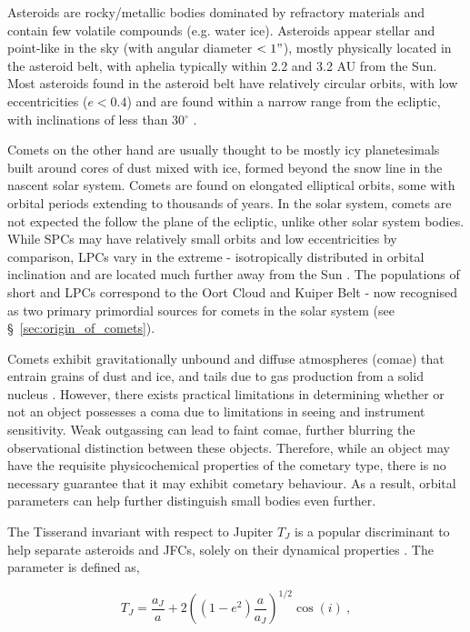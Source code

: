 Asteroids are rocky/metallic bodies dominated by refractory materials and contain few volatile compounds (e.g. water ice). Asteroids appear stellar and point-like in the sky (with angular diameter $< 1"$), mostly physically located in the asteroid belt, with aphelia typically within 2.2 and 3.2 AU from the Sun. Most asteroids found in the asteroid belt have relatively circular orbits, with low eccentricities ($e < 0.4$) and are found within a narrow range from the ecliptic, with inclinations of less than 30$^\circ$ \cite{2002AJ....123.2070T}. 

Comets on the other hand are usually thought to be mostly icy planetesimals built around cores of dust mixed with ice, formed beyond the snow line in the nascent solar system. Comets are found on elongated elliptical orbits, some with orbital periods extending to thousands of years. In the solar system, comets are not expected the follow the plane of the ecliptic, unlike other solar system bodies. While SPCs may have relatively small orbits and low eccentricities by comparison, LPCs vary in the extreme - isotropically distributed in orbital inclination and are located much further away from the Sun \cite{DEMEO2008436}. The populations of short and LPCs correspond to the Oort Cloud and Kuiper Belt -  now recognised as two primary primordial sources for comets in the solar system \cite{2017ApJ...845...27N} (see \S~\ref{sec:origin_of_comets}). 

Comets exhibit gravitationally unbound and diffuse atmospheres (comae) that entrain grains of dust and ice, and tails due to gas production from a solid nucleus \cite{1950ApJ...111..375W}. However, there exists practical limitations in determining whether or not an object possesses a coma due to limitations in seeing and instrument sensitivity. Weak outgassing can lead to faint comae, further blurring the observational distinction between these objects. Therefore, while an object may have the requisite physicochemical properties of the cometary type, there is no necessary guarantee that it may exhibit cometary behaviour. As a result, orbital parameters can help further distinguish small bodies even further.

The Tisserand invariant with respect to Jupiter $T_J$ is a popular discriminant to help separate asteroids and JFCs, solely on their dynamical properties \cite{1995EM&P...68...71C}. The parameter is defined as,

\begin{equation}
    T_J = \dfrac{a_J}{a} + 2\left( (1-e^2)\dfrac{a}{a_J}\right)^{1/2} \cos(i)~,
\end{equation}


